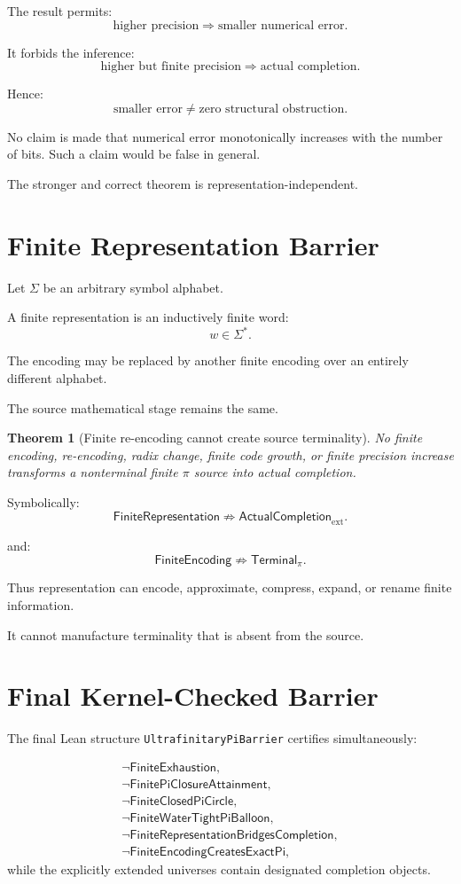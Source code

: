 \documentclass[11pt,a4paper]{article}
\newtheorem{theorem}{Theorem}
\newcommand{\Terminal}{\mathsf{Terminal}}
\newcommand{\ExternalCompletion}{\mathsf{ActualCompletion}_{\mathrm{ext}}}
\newcommand{\FiniteRepresentation}{\mathsf{FiniteRepresentation}}
\newcommand{\FiniteEncoding}{\mathsf{FiniteEncoding}}
\newcommand{\FiniteExhaustion}{\mathsf{FiniteExhaustion}}
\newcommand{\FinitePiClosureAttainment}{\mathsf{FinitePiClosureAttainment}}
\newcommand{\FiniteClosedPiCircle}{\mathsf{FiniteClosedPiCircle}}
\newcommand{\FiniteWaterTightPiBalloon}{\mathsf{FiniteWaterTightPiBalloon}}
\newcommand{\FiniteRepresentationBridgesCompletion}{\mathsf{FiniteRepresentationBridgesCompletion}}
\newcommand{\FiniteEncodingCreatesExactPi}{\mathsf{FiniteEncodingCreatesExactPi}}
\begin{document}
The result permits:
\[
\text{higher precision}
\Rightarrow
\text{smaller numerical error}.
\]

It forbids the inference:
\[
\text{higher but finite precision}
\Rightarrow
\text{actual completion}.
\]

Hence:
\[
\boxed{
\text{smaller error}\neq\text{zero structural obstruction}.
}
\]

No claim is made that numerical error monotonically increases with the
number of bits. Such a claim would be false in general.

The stronger and correct theorem is representation-independent.

\section{Finite Representation Barrier}

Let $\Sigma$ be an arbitrary symbol alphabet.

A finite representation is an inductively finite word:
\[
w\in\Sigma^\ast.
\]

The encoding may be replaced by another finite encoding over an entirely
different alphabet.

The source mathematical stage remains the same.

\begin{theorem}[Finite re-encoding cannot create source terminality]
No finite encoding, re-encoding, radix change, finite code growth, or
finite precision increase transforms a nonterminal finite $\pi$ source
into actual completion.
\end{theorem}

Symbolically:
\[
\boxed{
\FiniteRepresentation
\not\Rightarrow
\ExternalCompletion.
}
\]

and:
\[
\boxed{
\FiniteEncoding
\not\Rightarrow
\Terminal_\pi.
}
\]

Thus representation can encode, approximate, compress, expand, or
rename finite information.

It cannot manufacture terminality that is absent from the source.

\section{Final Kernel-Checked Barrier}

The final Lean structure
\texttt{UltrafinitaryPiBarrier} certifies simultaneously:

\begin{align}
\neg\FiniteExhaustion, \\
\neg\FinitePiClosureAttainment, \\
\neg\FiniteClosedPiCircle, \\
\neg\FiniteWaterTightPiBalloon, \\
\neg\FiniteRepresentationBridgesCompletion, \\
\neg\FiniteEncodingCreatesExactPi,
\end{align}
while the explicitly extended universes contain designated completion
objects.
\end{document}
